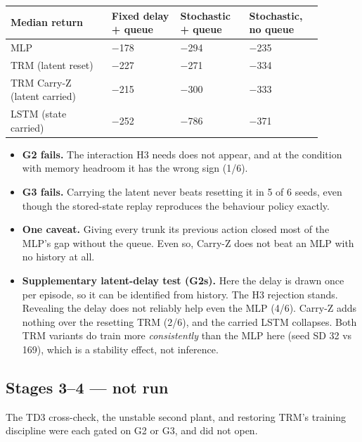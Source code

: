 \documentclass[11pt]{article}
\begin{document}
\begin{center}\small\begin{tabular}{>{\raggedright\arraybackslash}p{0.289\linewidth}>{\raggedleft\arraybackslash}p{0.196\linewidth}>{\raggedleft\arraybackslash}p{0.186\linewidth}>{\raggedleft\arraybackslash}p{0.207\linewidth}}
\toprule
Median return & Fixed delay + queue & Stochastic + queue & Stochastic, no queue \\
\midrule
MLP & $-$178 & $-$294 & $-$235 \\
TRM (latent reset) & $-$227 & $-$271 & $-$334 \\
TRM Carry-Z (latent carried) & $-$215 & $-$300 & $-$333 \\
LSTM (state carried) & $-$252 & $-$786 & $-$371 \\
\bottomrule
\end{tabular}\end{center}



\begin{itemize}
\item \textbf{G2 fails.} The interaction H3 needs does not appear, and at the condition with memory headroom it has the wrong sign (1/6).
\item \textbf{G3 fails.} Carrying the latent never beats resetting it in 5 of 6 seeds, even though the stored-state replay reproduces the behaviour policy exactly.
\item \textbf{One caveat.} Giving every trunk its previous action closed most of the MLP's gap without the queue. Even so, Carry-Z does not beat an MLP with no history at all.
\item \textbf{Supplementary latent-delay test (G2s).} Here the delay is drawn once per episode, so it can be identified from history. The H3 rejection stands. Revealing the delay does not reliably help even the MLP (4/6). Carry-Z adds nothing over the resetting TRM (2/6), and the carried LSTM collapses. Both TRM variants do train more \emph{consistently} than the MLP here (seed SD 32 vs 169), which is a stability effect, not inference.
\end{itemize}



\subsection*{Stages 3--4 --- not run}



The TD3 cross-check, the unstable second plant, and restoring TRM's training discipline were each gated on G2 or G3, and did not open.
\end{document}
